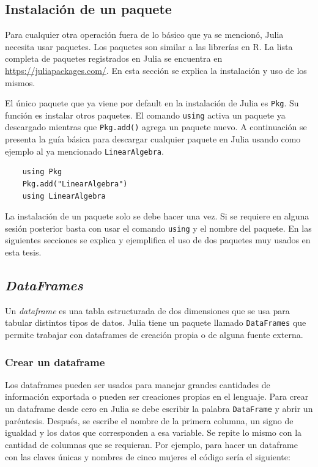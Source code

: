 \subsection{Instalación de un paquete} \label{instalacion_paquete}


Para cualquier otra operación fuera de lo básico que ya se mencionó, \textsf{Julia} necesita usar paquetes. Los paquetes son similar a las librerías en \textsf{R}. La lista completa de paquetes registrados en \textsf{Julia} se encuentra en \url{https://juliapackages.com/}. En esta sección se explica la instalación y uso de los mismos. 

El único paquete que ya viene por default en la instalación de \textsf{Julia} es \texttt{Pkg}. Su función es instalar otros paquetes. El comando \texttt{using} activa un paquete ya descargado mientras que \texttt{Pkg.add()} agrega un paquete nuevo. A continuación se presenta la guía básica para descargar cualquier paquete en \textsf{Julia} usando como ejemplo al ya mencionado \texttt{LinearAlgebra}. 


\begin{verbatim}
	using Pkg
	Pkg.add("LinearAlgebra")
	using LinearAlgebra
\end{verbatim}

La instalación de un paquete solo se debe hacer una vez. Si se requiere en alguna sesión posterior basta con usar el comando \texttt{using} y el nombre del paquete. En las siguientes secciones se explica y ejemplifica el uso de dos paquetes muy usados en esta tesis. 

\subsection{\textit{DataFrames}}

Un \textit{dataframe} es una tabla estructurada de dos dimensiones que se usa para tabular distintos tipos de datos. \textsf{Julia} tiene un paquete llamado \texttt{DataFrames} que permite trabajar con dataframes de creación propia o de alguna fuente externa. 

\subsubsection{Crear un dataframe}

Los dataframes pueden ser usados para manejar grandes cantidades de información exportada o pueden ser creaciones propias en el lenguaje. Para crear un dataframe desde cero en \textsf{Julia} se debe escribir la palabra \texttt{DataFrame} y abrir un paréntesis. Después, se escribe el nombre de la primera columna, un signo de igualdad y los datos que corresponden a esa variable. Se repite lo mismo con la cantidad de columnas que se requieran. Por ejemplo, para hacer un dataframe con las claves únicas y nombres de cinco mujeres el código sería el siguiente: 



